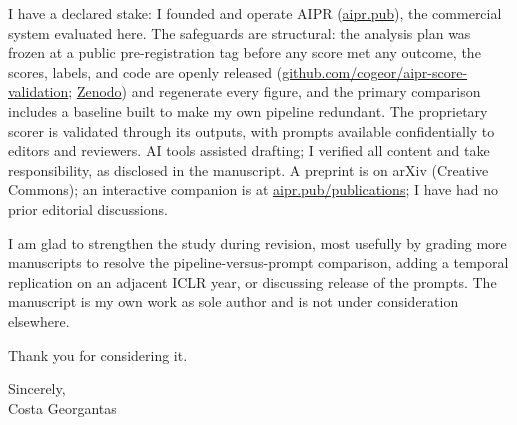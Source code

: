 \documentclass[11pt]{article}
\newcommand{\myname}{Costa Georgantas}
\begin{document}
I have a declared stake: I founded and operate AIPR
(\href{https://aipr.pub}{aipr.pub}), the commercial system evaluated here. The safeguards are
structural: the analysis plan was frozen at a public pre-registration tag before any score met
any outcome, the scores, labels, and code are openly released
(\href{https://github.com/cogeor/aipr-score-validation}{github.com/cogeor/aipr-score-validation};
\href{https://doi.org/10.5281/zenodo.21105072}{Zenodo}) and regenerate every figure, and the
primary comparison includes a baseline built to make my own pipeline redundant. The proprietary
scorer is validated through its outputs, with prompts available confidentially to editors and
reviewers. AI tools assisted drafting; I verified all content and take responsibility, as
disclosed in the manuscript. A preprint is on arXiv (Creative Commons); an interactive companion
is at \href{https://aipr.pub/publications}{aipr.pub/publications}; I have had no prior editorial
discussions.

I am glad to strengthen the study during revision, most usefully by grading more manuscripts to
resolve the pipeline-versus-prompt comparison, adding a temporal replication on an adjacent ICLR
year, or discussing release of the prompts. The manuscript is my own work as sole author and is
not under consideration elsewhere.

Thank you for considering it.

\smallskip
\noindent Sincerely,\\[0.3em]
\myname

\end{document}

